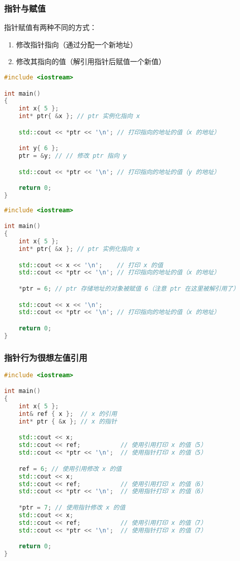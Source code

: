 \documentclass[../../LearnCpp.tex]{subfiles}
\begin{document}
\subsubsection*{指针与赋值}

指针赋值有两种不同的方式：

\begin{enumerate}
  \item 修改指针指向（通过分配一个新地址）
  \item 修改其指向的值（解引用指针后赋值一个新值）
\end{enumerate}

\begin{lstlisting}[language=C++]
#include <iostream>

int main()
{
    int x{ 5 };
    int* ptr{ &x }; // ptr 实例化指向 x

    std::cout << *ptr << '\n'; // 打印指向的地址的值（x 的地址）

    int y{ 6 };
    ptr = &y; // // 修改 ptr 指向 y

    std::cout << *ptr << '\n'; // 打印指向的地址的值（y 的地址）

    return 0;
}
\end{lstlisting}

\begin{lstlisting}[language=C++]
#include <iostream>

int main()
{
    int x{ 5 };
    int* ptr{ &x }; // ptr 实例化指向 x

    std::cout << x << '\n';    // 打印 x 的值
    std::cout << *ptr << '\n'; // 打印指向的地址的值（x 的地址）

    *ptr = 6; // ptr 存储地址的对象被赋值 6（注意 ptr 在这里被解引用了）

    std::cout << x << '\n';
    std::cout << *ptr << '\n'; // 打印指向的地址的值（x 的地址）

    return 0;
}
\end{lstlisting}

\subsubsection*{指针行为很想左值引用}

\begin{lstlisting}[language=C++]
#include <iostream>

int main()
{
    int x{ 5 };
    int& ref { x };  // x 的引用
    int* ptr { &x }; // x 的指针

    std::cout << x;
    std::cout << ref;           // 使用引用打印 x 的值（5）
    std::cout << *ptr << '\n';  // 使用指针打印 x 的值（5）

    ref = 6; // 使用引用修改 x 的值
    std::cout << x;
    std::cout << ref;           // 使用引用打印 x 的值（6）
    std::cout << *ptr << '\n';  // 使用指针打印 x 的值（6）

    *ptr = 7; // 使用指针修改 x 的值
    std::cout << x;
    std::cout << ref;           // 使用引用打印 x 的值（7）
    std::cout << *ptr << '\n';  // 使用指针打印 x 的值（7）

    return 0;
}
\end{lstlisting}
\end{document}
